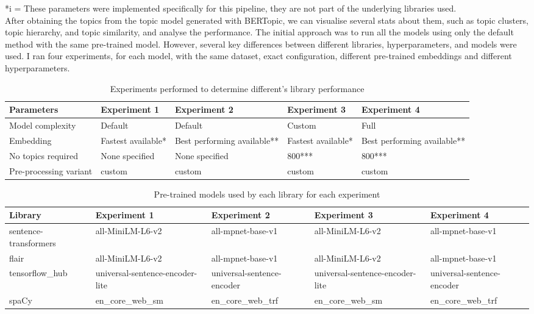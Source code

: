 \documentclass[12pt,MSc,a4paper,oneside]{muthesis}
\begin{document}
    *i = These parameters were implemented specifically for this pipeline, they are not part of the underlying libraries used. \\
    After obtaining the topics from the topic model generated with BERTopic, we can visualise several stats about them, such as topic clusters, topic hierarchy, and topic similarity, and analyse the performance.
    The initial approach was to run all the models using only the default method with the same pre-trained model. However, several key differences between different libraries, hyperparameters, and models were used. I ran four experiments, for each model, with the same dataset, exact configuration, different pre-trained embeddings and different hyperparameters.

    \begin{table}[h]
      \caption{Experiments performed to determine different's library performance}
      \label{tab:experiments}
      \begin{tabularx}{\textwidth}{|X|X|X|X|X|}
        \toprule
        {Parameters}&{Experiment 1}&{Experiment 2}&{Experiment 3}&{Experiment 4}\\
        \midrule
        Model complexity & Default & Default & Custom & Full\\\hline
        Embedding & Fastest available* & Best performing available** & Fastest available* & Best performing available**\\\hline
        No topics required & None specified & None specified & 800*** & 800*** \\\hline
        Pre-processing variant & custom & custom & custom & custom\\
        \bottomrule
      \end{tabularx}
    \end{table}

    \begin{table}[h]
      \caption{Pre-trained models used by each library for each experiment}
      \label{tab:pretrained-models}
      \begin{tabularx}{\textwidth}{| X  X  X  X  X |}
        \toprule
        {Library}&{Experiment 1}&{Experiment 2}&{Experiment 3}&{Experiment 4}\\
        \midrule
        sentence-transformers & all-MiniLM-L6-v2 & all-mpnet-base-v1 & all-MiniLM-L6-v2 & all-mpnet-base-v1\\\hline
        flair & all-MiniLM-L6-v2 & all-mpnet-base-v1 & all-MiniLM-L6-v2 & all-mpnet-base-v1\\\hline
        tensorflow_hub & universal-sentence-encoder-lite  & universal-sentence-encoder  & universal-sentence-encoder-lite  & universal-sentence-encoder \\\hline
        spaCy & en\_core\_web\_sm & en\_core\_web\_trf & en\_core\_web\_sm & en\_core\_web\_trf\\
        \bottomrule
      \end{tabularx}
    \end{table}
\end{document}
